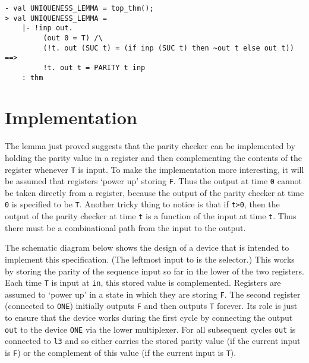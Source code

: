 \begin{session}
\begin{verbatim}
- val UNIQUENESS_LEMMA = top_thm();
> val UNIQUENESS_LEMMA =
    |- !inp out.
         (out 0 = T) /\
         (!t. out (SUC t) = (if inp (SUC t) then ~out t else out t)) ==>
         !t. out t = PARITY t inp
    : thm
\end{verbatim}
\end{session}

\section{Implementation}
\label{implementation}

The lemma just proved suggests that the parity checker can be
implemented by holding the parity value in a register and then
complementing the contents of the register whenever {\small\verb|T|}
is input. To make the implementation more interesting, it will be
assumed that registers `power up' storing {\small\verb|F|}. Thus the
output at time {\small\verb|0|} cannot be taken directly from a
register, because the output of the parity checker at time
{\small\verb|0|} is specified to be {\small\verb|T|}. Another tricky
thing to notice is that if {\small\verb|t>0|}, then the output of the
parity checker at time {\small\verb|t|} is a function of the input at
time {\small\verb|t|}. Thus there must be a combinational path from
the input to the output.

The schematic diagram below shows the design of
a device that is intended to implement this specification.
(The leftmost input to  is the selector.)
This works by storing the parity of the sequence input so far in the
lower of the two registers.  Each time {\small\verb|T|} is input at
{\small\verb|in|}, this stored value is complemented. Registers are assumed to
`power up' in a state in which they are storing {\small\verb|F|}.  The second
register (connected to {\small\verb|ONE|}) initially outputs
 {\small\verb|F|} and
then outputs {\small\verb|T|} forever.  Its role is just to ensure that the
device
works during the first cycle by connecting the output {\small\verb|out|} to the
device {\small\verb|ONE|} via the lower multiplexer.  For all subsequent cycles
{\small\verb|out|} is connected to {\small\verb|l3|} and so either carries the
stored parity value (if the current input is {\small\verb|F|}) or the
complement of this value (if the current input is {\small\verb|T|}).

